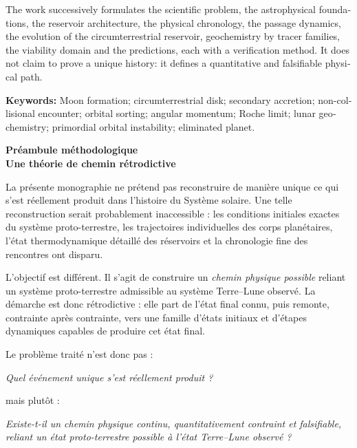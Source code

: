 \documentclass[11pt,a4paper,openany]{report}
\begin{document}
\begin{otherlanguage}{english}
The work successively formulates the scientific problem, the astrophysical foundations, the
reservoir architecture, the physical chronology, the passage dynamics, the evolution of the
circumterrestrial reservoir, geochemistry by tracer families, the viability domain and the
predictions, each with a verification method. It does not claim to prove a unique history: it
defines a quantitative and falsifiable physical path.

\bigskip
\noindent\textbf{Keywords:} Moon formation; circumterrestrial disk; secondary accretion;
non-collisional encounter; orbital sorting; angular momentum; Roche limit; lunar geochemistry; primordial orbital instability; eliminated planet.
\end{otherlanguage}

\clearpage
\thispagestyle{plain}
{}
\begin{center}
{\Large\bfseries Préambule méthodologique}\\[4pt]
{\large\bfseries Une théorie de chemin rétrodictive}
\end{center}
\medskip

La présente monographie ne prétend pas reconstruire de manière unique ce qui
s'est réellement produit dans l'histoire du Système solaire. Une telle
reconstruction serait probablement inaccessible : les conditions initiales
exactes du système proto-terrestre, les trajectoires individuelles des corps
planétaires, l'état thermodynamique détaillé des réservoirs et la chronologie
fine des rencontres ont disparu.

L'objectif est différent. Il s'agit de construire un \emph{chemin physique
possible} reliant un système proto-terrestre admissible au système Terre--Lune
observé. La démarche est donc rétrodictive : elle part de l'état final connu,
puis remonte, contrainte après contrainte, vers une famille d'états initiaux et
d'étapes dynamiques capables de produire cet état final.

Le problème traité n'est donc pas :

\begin{center}
\emph{Quel événement unique s'est réellement produit ?}
\end{center}

mais plutôt :

\begin{center}
\emph{Existe-t-il un chemin physique continu, quantitativement contraint et
falsifiable, reliant un état proto-terrestre possible à l'état Terre--Lune
observé ?}
\end{center}
\end{document}
